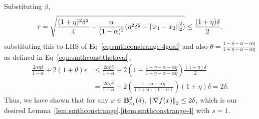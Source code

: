 Substituting $\beta$, 
\begin{equation*}
	r = \sqrt{\frac{(1+\eta)^2 \delta^2}{4}-\frac{\alpha}{(1-\alpha)^2} (\eta^2 \delta^2-\left\|{x_1-x_2}\right\|_2^2)} \leq \frac{(1+\eta)\delta}{2}.
\end{equation*}
substituting this to LHS of Eq~\eqref{eq:smthconstrange-4goal} and also $\theta = \frac{1-\eta-\alpha-\alpha\eta}{1+\eta-\alpha-\alpha\eta}$ as defined in Eq~\eqref{eqn:smthconstthetaval},
\begin{align*}
	\frac{2\alpha \eta \delta}{1-\alpha} + 2(1+\theta) r 
	&\leq 
	\frac{2\alpha \eta \delta}{1-\alpha} + 2 \left(1+ \frac{1-\eta-\alpha-\alpha\eta}{1+\eta-\alpha-\alpha\eta} \right) \frac{(1+\eta)\delta}{2}\\
	&=
	\frac{2\alpha \eta \delta}{1-\alpha} + 2 \left(\frac{1-\alpha-\alpha\eta}{(1+\eta)(1-\alpha)} \right) (1+\eta) \delta = 2\delta.
\end{align*}
Thus, we have shown that for any $x \in \mathbf{B}^2_{x_1}({\delta})$, $\left\|{\nabla f(x)}\right\|_2 \leq 2\delta$, which is our desired Lemma~\ref{lem:smthconstrange}.\ref{item:smthconstrange-4} with $s = 1$.

